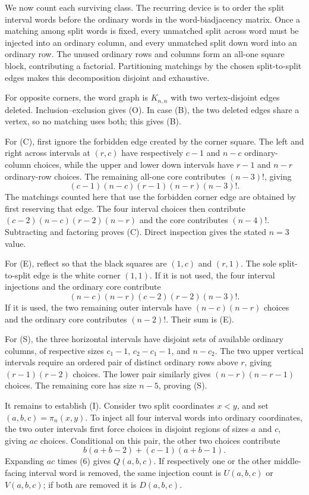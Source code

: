 \documentclass[11pt]{article}
\begin{document}
We now count each surviving class.  The recurring device is to order the split
interval words before the ordinary words in the word-biadjacency matrix.  Once
a matching among split words is fixed, every unmatched split across word must
be injected into an ordinary column, and every unmatched split down word into
an ordinary row.  The unused ordinary rows and columns form an all-one square
block, contributing a factorial.  Partitioning matchings by the chosen
split-to-split edges makes this decomposition disjoint and exhaustive.

For opposite corners, the word graph is $K_{n,n}$ with two vertex-disjoint
edges deleted.  Inclusion--exclusion gives (O).  In case (B), the two deleted
edges share a vertex, so no matching uses both; this gives (B).

For (C), first ignore the forbidden edge created by the corner square.  The
left and right across intervals at $(r,c)$ have respectively $c-1$ and $n-c$
ordinary-column choices, while the upper and lower down intervals have
$r-1$ and $n-r$ ordinary-row choices.  The remaining all-one core contributes
$(n-3)!$, giving
\[
 (c-1)(n-c)(r-1)(n-r)(n-3)!.
\]
The matchings counted here that use the forbidden corner edge are obtained by
first reserving that edge.  The four interval choices then contribute
$(c-2)(n-c)(r-2)(n-r)$ and the core contributes $(n-4)!$.
Subtracting and factoring proves (C).  Direct inspection gives the stated
$n=3$ value.

For (E), reflect so that the black squares are $(1,c)$ and $(r,1)$.  The sole
split-to-split edge is the white corner $(1,1)$.  If it is not used, the four
interval injections and the ordinary core contribute
\[
 (n-c)(n-r)(c-2)(r-2)(n-3)!.
\]
If it is used, the two remaining outer intervals have $(n-c)(n-r)$ choices
and the ordinary core contributes $(n-2)!$.  Their sum is (E).

For (S), the three horizontal intervals have disjoint sets of available
ordinary columns, of respective sizes $c_1-1$, $c_2-c_1-1$, and $n-c_2$.
The two upper vertical intervals require an ordered pair of distinct ordinary
rows above $r$, giving $(r-1)(r-2)$ choices.  The lower pair similarly gives
$(n-r)(n-r-1)$ choices.  The remaining core has size $n-5$, proving (S).

It remains to establish (I).  Consider two split coordinates $x<y$, and set
$(a,b,c)=\pi_n(x,y)$.  To inject all four interval words into ordinary
coordinates, the two outer intervals first force choices in disjoint regions
of sizes $a$ and $c$, giving $ac$ choices.  Conditional on this pair, the
other two choices contribute
\[
     b(a+b-2)+(c-1)(a+b-1).                                  \tag{6}
\]
Expanding $ac$ times (6) gives $Q(a,b,c)$.  If respectively one or the other
middle-facing interval word is removed, the same injection count is
$U(a,b,c)$ or $V(a,b,c)$; if both are removed it is $D(a,b,c)$.
\end{document}
